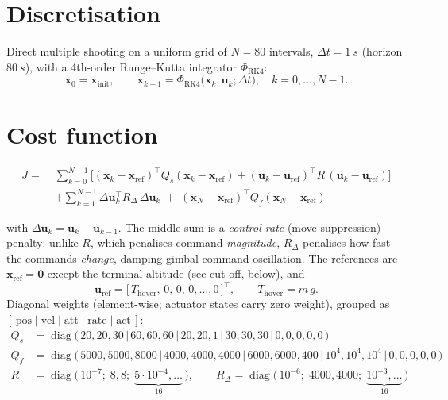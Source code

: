 \documentclass[11pt]{article}
\newcommand{\x}{\bm{x}}
\newcommand{\uu}{\bm{u}}
\newcommand{\vT}{^{\!\top}}
\begin{document}
\section*{Discretisation}

Direct multiple shooting on a uniform grid of $N=80$ intervals,
$\Delta t=\SI{1}{s}$ (horizon $\SI{80}{s}$), with a 4th-order Runge--Kutta
integrator $\Phi_{\mathrm{RK4}}$:
\[
\x_0 = \x_{\mathrm{init}},
\qquad
\x_{k+1} = \Phi_{\mathrm{RK4}}\!\big(\x_k,\uu_k;\Delta t\big),
\quad k=0,\dots,N-1 .
\]

\section*{Cost function}

\[
\begin{aligned}
J =\;&
\sum_{k=0}^{N-1}
\Big[
(\x_k-\x_{\mathrm{ref}})\vT Q_s (\x_k-\x_{\mathrm{ref}})
+(\uu_k-\uu_{\mathrm{ref}})\vT R\, (\uu_k-\uu_{\mathrm{ref}})
\Big]\\
&+\sum_{k=1}^{N-1}
\Delta\uu_k\vT R_\Delta\,\Delta\uu_k
\;+\;(\x_N-\x_{\mathrm{ref}})\vT Q_f (\x_N-\x_{\mathrm{ref}})
\end{aligned}
\]

with $\Delta\uu_k=\uu_k-\uu_{k-1}$. The middle sum is a \emph{control-rate}
(move-suppression) penalty: unlike $R$, which penalises command \emph{magnitude},
$R_\Delta$ penalises how fast the commands \emph{change}, damping gimbal-command
oscillation. The references are $\x_{\mathrm{ref}}=\bm 0$ except the terminal
altitude (see cut-off, below), and
\[
\uu_{\mathrm{ref}}=\big[\,T_{\mathrm{hover}},\,0,\,0,\,0,\dots,0\,\big]\vT,
\qquad T_{\mathrm{hover}}=m\,g .
\]
Diagonal weights (element-wise; actuator states carry zero weight), grouped
as $[\,\text{pos}\mid\text{vel}\mid\text{att}\mid\text{rate}\mid\text{act}\,]$:
\begingroup\small
\begin{align*}
Q_s &= \operatorname{diag}\!\big(\,20,20,30 \,\big|\, 60,60,60 \,\big|\, 20,20,1 \,\big|\, 30,30,30 \,\big|\, 0,0,0,0,0\,\big)\\[3pt]
Q_f &= \operatorname{diag}\!\big(\,5000,5000,8000 \,\big|\, 4000,4000,4000 \,\big|\, 6000,6000,400 \,\big|\, 10^4,10^4,10^4 \,\big|\, 0,0,0,0,0\,\big)\\[3pt]
R   &= \operatorname{diag}\!\big(\,10^{-7};\; 8,8;\; \underbrace{5\!\cdot\!10^{-4},\dots}_{16}\,\big),
\qquad
R_\Delta = \operatorname{diag}\!\big(\,10^{-6};\; 4000,4000;\; \underbrace{10^{-3},\dots}_{16}\,\big)
\end{align*}
\endgroup
\end{document}
